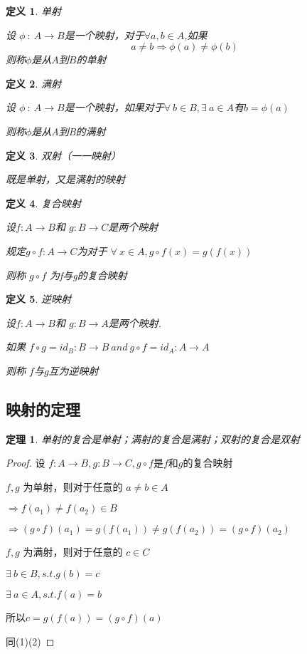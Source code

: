 \documentclass[hyperref,UTF8]{ctexart}
\newtheorem{theorem}{定理}[subsection]
\newtheorem{definition}{定义}[subsection]
\begin{document}
	\begin{definition}单射
		
	设 $ \phi{\ :\  }  A \to B$是一个映射，对于$\forall a,b\in A$,如果 \[a\neq b \Rightarrow \phi(a)\neq \phi(b)\]则称$\phi$是从$ A $到$ B $的单射
	\end{definition}
	
	\begin{definition}
		满射
		
		设 $ \phi{\ :\  }  A \to B$是一个映射，如果对于$\forall \ b\in B,\exists \  a\in A$有$b=\phi(a)$
		
		则称$\phi$是从A到B的满射
	\end{definition}

    \begin{definition}
		双射（一一映射）
		
		既是单射，又是满射的映射 
	\end{definition}

	\begin{definition}
		复合映射
		
		设$ f:A\to B $和 $ g:B \to C $是两个映射
		
		规定$ g\circ f:A\to C $为对于 $\forall \ x \in A ,g\circ f(x) =g(f(x))$
		
		则称 $ g\circ f $ 为f与g的复合映射
	\end{definition}

	\begin{definition}
		逆映射
		
		设$ f:A\to B $和 $ g:B \to A $是两个映射.
		
		如果 $ f\circ g = id_B:B\to B\  and\ g\circ f = id_A:A\to A $
		
		则称 $ f $与$ g $互为逆映射 
	\end{definition}


	\subsection{映射的定理}
\begin{theorem}
	单射的复合是单射；满射的复合是满射；双射的复合是双射
\end{theorem}
	\begin{proof}
	设 $ f:A\to B,g:B\to C,g\circ f $是$f$和$g$的复合映射
	
	\item[(1)]$f,g$ 为单射，则对于任意的 $a\neq b \in A$
	
	$\Rightarrow f(a_1)\neq  f(a_2)\in B$
	
	$\Rightarrow (g\circ f)(a_1)=g(f(a_1)) \neq g(f(a_2))=(g\circ f)(a_2)$
	\item[(2)]$f,g$ 为满射，则对于任意的 $c\in C$
	
	$\exists\  b\in B,s.t. g(b) = c$
	
	$\exists\  a\in A,s.t. f(a)= b$
	
	所以$c=g(f(a))=(g\circ f)(a)$
	
	
	\item[(3)]  同(1)(2)
	\end{proof}	
	
\end{document}
